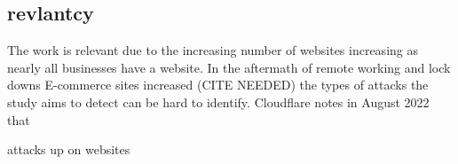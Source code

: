 \subsection{revlantcy}
The work is relevant due to the increasing number of websites increasing as nearly all businesses have a website. In the aftermath of remote working and lock downs E-commerce sites increased (CITE NEEDED) the types of attacks the study aims to detect can be hard to identify. Cloudflare notes in August  2022 that 

attacks up on websites